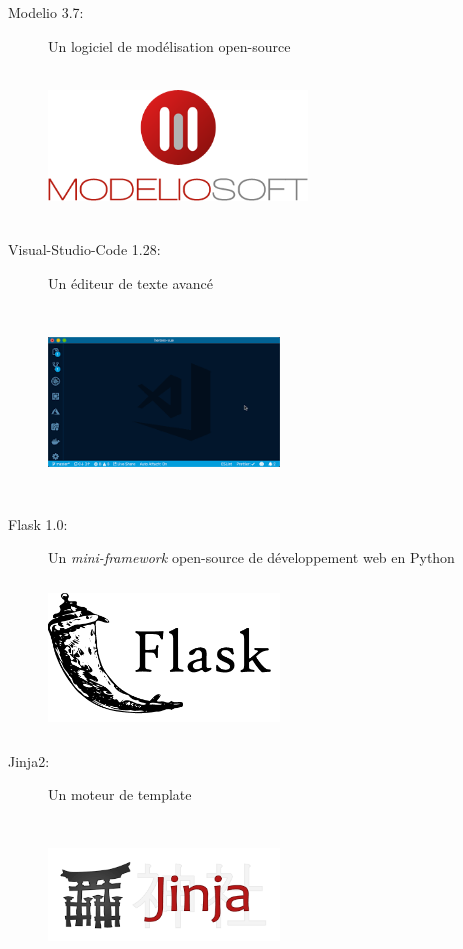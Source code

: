 \documentclass[12pt]{report}
\begin{document}
	\begin{description}
		\item[\sc Modelio 3.7:] Un logiciel de modélisation open-source
				\begin{center}
					\includegraphics[scale=1, width=0.56\textwidth, height=4cm]{modelio}
					\label{modelio}
				\end{center}
		
		\item[\sc Visual-Studio-Code 1.28:] Un éditeur de texte avancé
				\begin{center}
					\includegraphics[scale=1, width=0.5\textwidth, height=5cm]{vscode}
					\label{vscode}
				\end{center}
		\item[\sc Flask 1.0:]  Un \textit{mini-framework} open-source de développement web en Python
		
				\begin{center}
					\includegraphics[scale=1, width=0.5\textwidth, height=4cm]{flask}
					\label{flask}
				\end{center}
		\item[\sc Jinja2:] Un moteur de template
			\begin{center}
				\includegraphics[scale=1, width=0.5\textwidth, height=4cm]{jinja}
				\label{jinja}
			\end{center}
			

\end{description}
\end{document}
